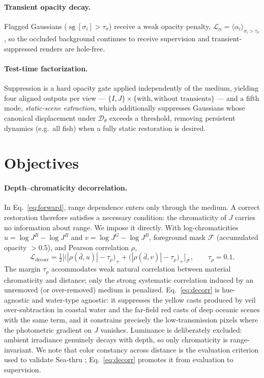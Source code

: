 \documentclass[11pt,a4paper]{article}
\newcommand{\J}{J}
\newcommand{\I}{I}
\newcommand{\sg}{\operatorname{sg}}
\newcommand{\Lcal}{\mathcal{L}}
\begin{document}
\paragraph{Transient opacity decay.}
Flagged Gaussians ($\sg[\sigma_i] > \tau_\sigma$) receive a weak opacity penalty, $\Lcal_{\alpha} = \langle \alpha_i \rangle_{\sigma_i > \tau_\sigma}$, so the occluded background continues to receive supervision and transient-suppressed renders are hole-free.

\paragraph{Test-time factorization.}
Suppression is a hard opacity gate applied independently of the medium, yielding four aligned outputs per view --- $\{\I, \J\} \times \{\text{with},\text{without transients}\}$ --- and a fifth mode, \emph{static-scene extraction}, which additionally suppresses Gaussians whose canonical displacement under $\mathcal{D}_\theta$ exceeds a threshold, removing persistent dynamics (e.g.\ all fish) when a fully static restoration is desired.

\section{Objectives}
\label{sec:losses}

\paragraph{Depth--chromaticity decorrelation.}
In Eq.~\eqref{eq:forward}, range dependence enters only through the medium. A correct restoration therefore satisfies a necessary condition: the chromaticity of $\J$ carries no information about range. We impose it directly. With log-chromaticities $u = \log\J^R - \log\J^B$ and $v = \log\J^G - \log\J^B$, foreground mask $\mathcal{F}$ (accumulated opacity $>0.5$), and Pearson correlation $\rho$,
\begin{equation}
    \Lcal_{\text{decorr}}
    =
    \tfrac{1}{2}\Big[
    \big(|\rho(\bar d, u)| - \tau_\rho\big)_+
    +
    \big(|\rho(\bar d, v)| - \tau_\rho\big)_+
    \Big]_{\mathcal{F}},
    \qquad \tau_\rho = 0.1 .
    \label{eq:decorr}
\end{equation}
The margin $\tau_\rho$ accommodates weak natural correlation between material chromaticity and distance; only the strong systematic correlation induced by an unremoved (or over-removed) medium is penalized. Eq.~\eqref{eq:decorr} is hue-agnostic and water-type agnostic: it suppresses the yellow casts produced by veil over-subtraction in coastal water and the far-field red casts of deep oceanic scenes with the same term, and it constrains precisely the low-transmission pixels where the photometric gradient on $\J$ vanishes. Luminance is deliberately excluded: ambient irradiance genuinely decays with depth, so only chromaticity is range-invariant. We note that color constancy across distance is the evaluation criterion used to validate Sea-thru \cite{akkaynak2019sea}; Eq.~\eqref{eq:decorr} promotes it from evaluation to supervision.
\end{document}
